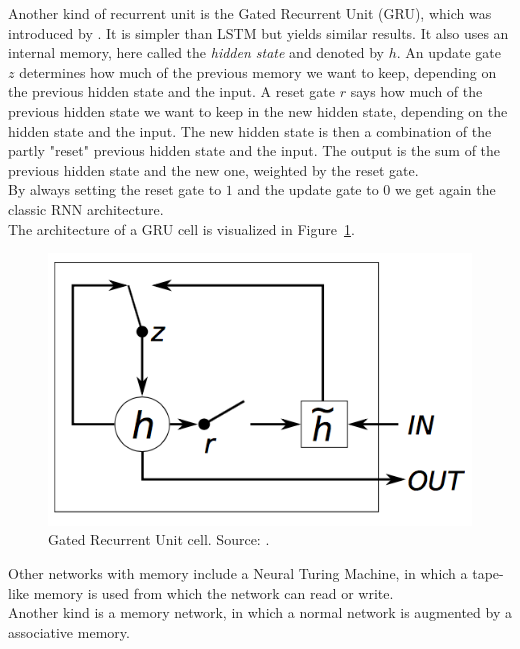 Another kind of recurrent unit is the Gated Recurrent Unit (GRU), which was introduced by \cite{Cho2014LearningTranslation}. It is simpler than LSTM but yields similar results.
It also uses an internal memory, here called the \textit{hidden state} and denoted by $h$. An update gate $z$ determines how much of the previous memory we want to keep, depending on the previous hidden state and the input. A reset gate $r$ says how much of the previous hidden state we want to keep in the new hidden state, depending on the hidden state and the input. The new hidden state is then a combination of the partly "reset" previous hidden state and the input. The output is the sum of the previous hidden state and the new one, weighted by the reset gate.\\
By always setting the reset gate to $1$ and the update gate to $0$ we get again the classic RNN architecture.\\
The architecture of a GRU cell is visualized in Figure~\ref{fig:gru}.\\
\begin{figure}[htb]
    \centering
    \includegraphics[width=0.6\linewidth]{images/gru.png}
    \caption[Gated Recurrent Unit cell]{Gated Recurrent Unit cell. Source: \cite{journals/corr/ChungGCB14}.}
    \label{fig:gru}
\end{figure}

Other networks with memory include a Neural Turing Machine, in which a tape-like memory is used from which the network can read or write.\\
Another kind is a memory network, in which a normal network is augmented by a associative memory.\\
